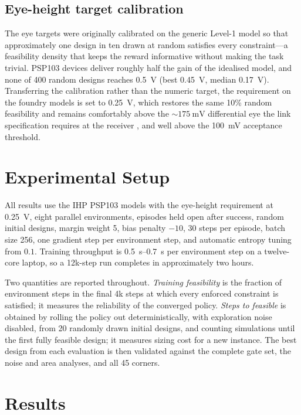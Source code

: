 \documentclass[10pt,a4paper]{article}
\begin{document}
\subsection{Eye-height target calibration}
\label{sec:eye-target}

The eye targets were originally calibrated on the generic Level-1 model so that
approximately one design in ten drawn at random satisfies every constraint---a
feasibility density that keeps the reward informative without making the task
trivial. PSP103 devices deliver roughly half the gain of the idealised model, and
none of 400 random designs reaches \SI{0.5}{\volt} (best \SI{0.45}{\volt}, median
\SI{0.17}{\volt}). Transferring the calibration rather than the numeric target,
the requirement on the foundry models is set to \SI{0.25}{\volt}, which restores
the same 10\% random feasibility and remains comfortably above the
$\sim\SI{175}{\milli\volt}$ differential eye the link specification requires at
the receiver \cite{pcisig2007}, and well above the \SI{100}{\milli\volt}
acceptance threshold.

\section{Experimental Setup}
\label{sec:setup}

All results use the IHP PSP103 models with the eye-height requirement at
\SI{0.25}{\volt}, eight parallel environments, episodes held open after success,
random initial designs, margin weight 5, bias penalty $-10$, 30 steps per
episode, batch size 256, one gradient step per environment step, and automatic
entropy tuning from $0.1$. Training throughput is \SIrange{0.5}{0.7}{\second} per
environment step on a twelve-core laptop, so a 12k-step run completes in
approximately two hours.

Two quantities are reported throughout. \emph{Training feasibility} is the
fraction of environment steps in the final 4k steps at which every enforced
constraint is satisfied; it measures the reliability of the converged policy.
\emph{Steps to feasible} is obtained by rolling the policy out deterministically,
with exploration noise disabled, from 20 randomly drawn initial designs, and
counting simulations until the first fully feasible design; it measures sizing
cost for a new instance. The best design from each evaluation is then validated
against the complete gate set, the noise and area analyses, and all 45 corners.

\section{Results}
\label{sec:results}
\end{document}
